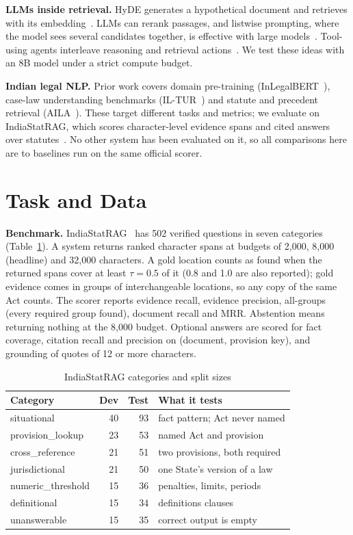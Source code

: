 \documentclass[conference]{IEEEtran}
\begin{document}
\textbf{LLMs inside retrieval.} HyDE generates a hypothetical document and retrieves with its
embedding~\cite{gao2023hyde}. LLMs can rerank passages, and listwise prompting, where the model sees several
candidates together, is effective with large models~\cite{sun2023rankgpt}. Tool-using agents interleave reasoning
and retrieval actions~\cite{yao2023react}. We test these ideas with an 8B model under a strict compute budget.

\textbf{Indian legal NLP.} Prior work covers domain pre-training (InLegalBERT~\cite{paul2023inlegalbert}), case-law
understanding benchmarks (IL-TUR~\cite{joshi2024iltur}) and statute and precedent retrieval
(AILA~\cite{bhattacharya2019aila}). These target different tasks and metrics; we evaluate on IndiaStatRAG, which
scores character-level evidence spans and cited answers over statutes~\cite{indiastatrag}. No other system has
been evaluated on it, so all comparisons here are to baselines run on the same official scorer.

\section{Task and Data}

\textbf{Benchmark.} IndiaStatRAG~\cite{indiastatrag} has 502 verified questions in seven categories
(Table~\ref{tab:bench}). A system returns ranked character spans at budgets of 2,000, 8,000 (headline) and 32,000
characters. A gold location counts as found when the returned spans cover at least $\tau=0.5$ of it (0.8 and 1.0
are also reported); gold evidence comes in groups of interchangeable locations, so any copy of the same Act
counts. The scorer reports evidence recall, evidence precision, all-groups (every required group found), document
recall and MRR. Abstention means returning nothing at the 8,000 budget. Optional answers are scored for fact
coverage, citation recall and precision on (document, provision key), and grounding of quotes of 12 or more
characters.

\begin{table}[t]
\caption{IndiaStatRAG categories and split sizes}
\label{tab:bench}
\centering
\footnotesize
\begin{tabular}{@{}lrrl@{}}
\toprule
Category & Dev & Test & What it tests \\
\midrule
situational & 40 & 93 & fact pattern; Act never named \\
provision\_lookup & 23 & 53 & named Act and provision \\
cross\_reference & 21 & 51 & two provisions, both required \\
jurisdictional & 21 & 50 & one State's version of a law \\
numeric\_threshold & 15 & 36 & penalties, limits, periods \\
definitional & 15 & 34 & definitions clauses \\
unanswerable & 15 & 35 & correct output is empty \\
\bottomrule
\end{tabular}
\end{table}
\end{document}
